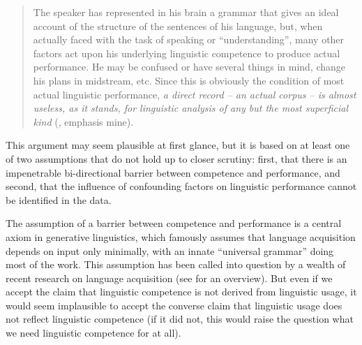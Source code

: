 \begin{quote}The speaker has represented in his brain a grammar that gives an ideal account of the structure of the sentences of his language, but, when actually faced with the task of speaking or ``understanding'', many other factors act upon his underlying linguistic competence  to produce actual performance.  He may be confused or have several things in mind, change his plans in midstream, etc. Since this is obviously the condition of most actual linguistic performance, \emph{a direct record -- an actual corpus -- is almost useless, as it stands, for linguistic analysis of any but the most superficial kind} (\citealt[36]{chomsky_development_1964}, emphasis mine).
\end{quote}

This argument may seem plausible at first glance, but it is based on at least one of two assumptions that do not hold up to closer scrutiny: first, that there is an impenetrable bi\hyp{}directional barrier between competence  and performance,  and second, that the influence of confounding factors on linguistic performance cannot be identified in the data.

The assumption of a barrier between competence and performance  is a central axiom in generative  linguistics, which famously assumes that language acquisition  depends on input only minimally, with an innate ``universal grammar'' doing most of the work. This assumption has been called into question by a wealth of recent research on language acquisition (see \citealt{tomasello_constructing_2003} for an overview). But even if we accept the claim that linguistic competence  is not derived from linguistic usage, it would seem implausible to accept the converse claim that linguistic usage does not reflect linguistic competence (if it did not, this would raise the question what we need linguistic competence for at all).

